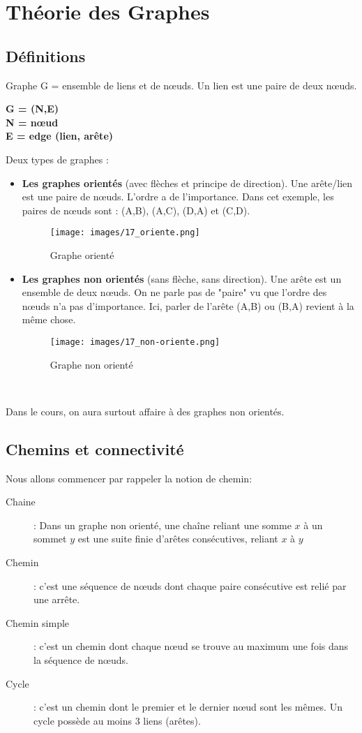 \chapter{Théorie des Graphes}

\section{Définitions\\}
Graphe G = ensemble de liens et de nœuds. Un lien est une paire de deux nœuds.
\begin{center}
\textbf{
G = (N,E)\\
N = nœud\\
E = edge (lien, arête)\\
}
\end{center}
Deux types de graphes :
\begin{itemize}

\item \textbf{Les graphes orientés} (avec flèches et principe de direction). Une arête/lien est une paire de nœuds. L'ordre a de l'importance. Dans cet exemple, les paires de nœuds sont : (A,B), (A,C), (D,A) et (C,D). 
\begin{figure}[!h]
\centering
\texttt{[image: images/17\_oriente.png]}
\caption{Graphe orienté}
\end{figure}
\item \textbf{Les graphes non orientés} (sans flèche, sans direction). Une arête est un ensemble de deux nœuds. On ne parle pas de "paire" vu que l'ordre des nœuds n'a pas d'importance. Ici, parler de l'arête (A,B) ou (B,A) revient à la même chose.
\begin{figure}[!h]
\centering
\texttt{[image: images/17\_non-oriente.png]}
\caption{Graphe non orienté}
\end{figure}
\\
\end{itemize}
Dans le cours, on aura surtout affaire à des graphes non orientés.

\section{Chemins et connectivité}
Nous allons commencer par rappeler la notion de chemin:
	\begin{description}
	\item [Chaine] : Dans un graphe non orienté, une chaîne reliant une somme $x$ à un sommet $y$ est une suite finie d'arêtes consécutives, reliant $x$ à $y$
	\item[Chemin]: c'est une séquence de n\oe uds dont chaque paire consécutive est relié par une arrête.
    	\item[Chemin simple]: c'est un chemin dont chaque n\oe ud se trouve au maximum une fois dans la séquence de n\oe uds.
    	\item[Cycle]: c'est un chemin dont le premier et le dernier n\oe ud sont les mêmes. Un cycle possède au moins 3 liens (arêtes).\\
	\end{description}


